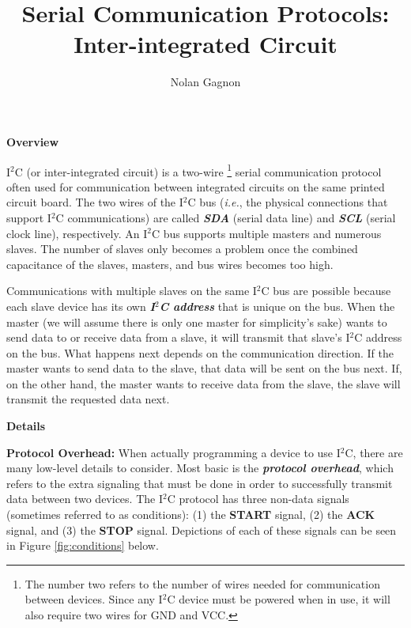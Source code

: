 \documentclass{article}
\title{Serial Communication Protocols: \\
	   \textbf{Inter-integrated Circuit}}
\author{Nolan Gagnon}
\begin{document}
\maketitle

\begin{center}
\begin{Large}
\textbf{Overview}
\end{Large}
\end{center}

\noindent I$^2$C (or inter-integrated circuit) is a two-wire \footnote{The number two refers to the number of wires needed for communication between devices.  Since any I$^2$C device must be powered when in use, it will also require two wires for GND and VCC.} serial communication protocol often used for communication between integrated circuits on the same printed circuit board.  The two wires of the I$^2$C bus (\textit{i.e.}, the physical connections that support I$^2$C communications) are called \textbf{\textit{SDA}} (serial data line) and \textbf{\textit{SCL}} (serial clock line), respectively.  An I$^2$C bus supports multiple masters and numerous slaves.  The number of slaves only becomes a problem once the combined capacitance of the slaves, masters, and bus wires becomes too high.

\vspace{3mm}

\noindent Communications with multiple slaves on the same I$^2$C bus are possible because each slave device has its own \textbf{\textit{I$^2$C address}} that is unique on the bus.  When the master (we will assume there is only one master for simplicity's sake) wants to send data to or receive data from a slave, it will transmit that slave's I$^2$C address on the bus.  What happens next depends on the communication direction.  If the master wants to send data to the slave, that data will be sent on the bus next.  If, on the other hand, the master wants to receive data from the slave, the slave will transmit the requested data next.

\vspace{5mm}

\begin{center}
\begin{Large}
\textbf{Details}
\end{Large}
\end{center}

\noindent\textbf{Protocol Overhead:} When actually programming a device to use I$^2$C, there are many low-level details to consider.  Most basic is the \textbf{\textit{protocol overhead}}, which refers to the extra signaling that must be done in order to successfully transmit data between two devices.  The I$^2$C protocol has three non-data signals (sometimes referred to as conditions): (1) the \textbf{START} signal, (2) the \textbf{ACK} signal, and (3) the \textbf{STOP} signal.  Depictions of each of these signals can be seen in Figure \ref{fig:conditions} below.  
\end{document}

